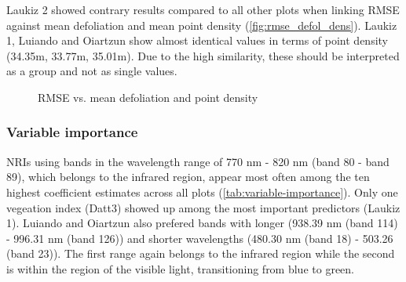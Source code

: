 \documentclass[review]{elsarticle}
\begin{document}
Laukiz 2 showed contrary results compared to all other plots when linking \ac{RMSE} against mean defoliation and mean point density (\autoref{fig:rmse_defol_dens}).
Laukiz 1, Luiando and Oiartzun show almost identical values in terms of point density (34.35m, 33.77m, 35.01m).
Due to the high similarity, these should be interpreted as a group and not as single values.

\begin{figure} [b!]
	\begin{center}
		\caption{RMSE vs. mean defoliation and point density}
		\label{fig:rmse_defol_dens}
	\end{center}
\end{figure}

\subsubsection{Variable importance}

\ac{NRI}s using bands in the wavelength range of 770 nm - 820 nm (band 80 - band 89), which belongs to the infrared region, appear most often among the ten highest coefficient estimates across all plots (\autoref{tab:variable-importance}).
Only one vegeation index (Datt3) showed up among the most important predictors (Laukiz 1).
Luiando and Oiartzun also prefered bands with longer (938.39 nm (band 114) - 996.31 nm (band 126)) and shorter wavelengths (480.30 nm (band 18) - 503.26 (band 23)).
The first range again belongs to the infrared region while the second is within the region of the visible light, transitioning from blue to green.
\end{document}

